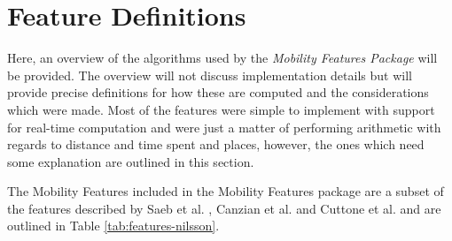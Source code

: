 \section{Feature Definitions}
\label{section:definitions}
Here, an overview of the algorithms used by the \textit{Mobility Features Package} will be provided. The overview will not discuss implementation details but will provide precise definitions for how these are computed and the considerations which were made. Most of the features were simple to implement with support for real-time computation and were just a matter of performing arithmetic with regards to distance and time spent and places, however, the ones which need some explanation are outlined in this section. 

The Mobility Features included in the Mobility Features package are a subset of the features described by Saeb et al. \cite{Saeb2015}, Canzian et al. \cite{Canzian2015} and Cuttone et al. \cite{sparse-location-2014} and are outlined in Table \ref{tab:features-nilsson}.

